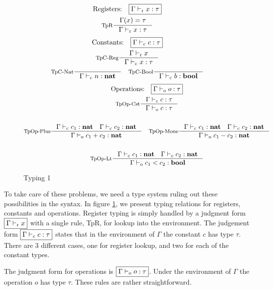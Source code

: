 \documentclass[a4paper, oneside, 10pt, final]{memoir}
\begin{document}
\begin{figure}
  \begin{gather*}
    \text{Registers:} \quad \boxed{\Gamma \tpr x : \tau}\\
    \inference[TpR]{\Gamma(x) = \tau}{\Gamma \tpr x : \tau}
  \end{gather*}
  \begin{gather*}
    \text{Constants:} \quad \boxed{\Gamma \tpc c : \tau}\\
    \inference[TpC-Reg]{\Gamma \tpr x}{\Gamma \tpc x : \tau}\\
    \inference[TpC-Nat]{}{\Gamma \tpc n : \tnat} \quad
    \inference[TpC-Bool]{}{\Gamma \tpc b : \tbool}
  \end{gather*}
  \begin{gather*}
    \text{Operations:} \quad \boxed{\Gamma \tpop o : \tau} \\
    \inference[TpOp-Cst]{\Gamma \tpc c : \tau}{\Gamma \tpop c : \tau}\\\\
    \inference[TpOp-Plus]{\Gamma \tpc c_1 : \tnat \quad \Gamma
      \tpc c_2 : \tnat}{\Gamma \tpop c_1 + c_2 : \tnat} \quad
    \inference[TpOp-Mone]{\Gamma \tpc c_1 : \tnat \quad \Gamma
      \tpc c_2 : \tnat}{\Gamma \tpop c_1 - c_2 : \tnat}\\\\
    \inference[TpOp-Lt]{\Gamma \tpc c_1 : \tnat \quad \Gamma
      \tpc c_2 : \tnat}{\Gamma \tpop c_1 < c_2 : \tbool}
  \end{gather*}
  \caption{Typing 1}
  \label{fig:type-judgement-1}
\end{figure}

To take care of these problems, we need a type system ruling out these
possibilities in the syntax. In figure \ref{fig:type-judgement-1}, we
present typing relations for registers, constants and
operations. Register typing is simply handled by a judgment form
$\boxed{\Gamma |-_{\mathrm{r}} x}$ with a single rule, TpR, for lookup into the
environment. The judgement form $\boxed{\Gamma |-_{\mathrm{c}} c : \tau}$ states
that in the environment of $\Gamma$ the constant $c$ has type
$\tau$. There are 3 different cases, one for register lookup, and two
for each of the constant types.

The judgment form for operations is $\boxed{\Gamma |-_{\mathrm{o}} o :
  \tau}$. Under the environment of $\Gamma$ the operation $o$ has
type $\tau$. These rules are rather straightforward.
\end{document}
